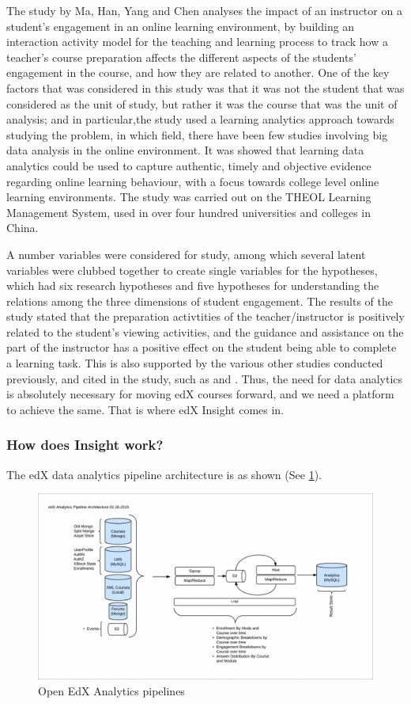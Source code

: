 \documentclass[14pt]{article}
\begin{document}
The study by Ma, Han, Yang and Chen \cite{ma2015examining} analyses the impact of an instructor on a student's engagement in an online learning environment, by building an interaction activity model for the teaching and learning process to track how a teacher's course preparation affects the different aspects of the students' engagement in the course, and how they are related to another. One of the key factors that was considered in this study was that it was not the student that was considered as the unit of study, but rather it was the course that was the unit of analysis; and in particular,the study used a learning analytics approach towards studying the problem, in which field, there have been few studies involving big data analysis in the online environment. It was showed that learning data analytics could be used to capture authentic, timely and objective evidence regarding online learning behaviour, with a focus towards college level online learning environments. The study was carried out on the THEOL Learning Management System, used in over four hundred universities and colleges in China.

A number variables were considered for study, among which several latent variables were clubbed together to create single variables for the hypotheses, which had six research hypotheses and five hypotheses for understanding the relations among the three dimensions of student engagement. The results of the study stated that the preparation activtities of the teacher/instructor is positively related to the student's viewing activities, and the guidance and assistance on the part of the instructor has a positive effect on the student being able to complete a learning task. This is also supported by the various  other studies conducted previously, and cited in the study, such as \cite{Morris2005221} and \cite{falakmasir2010using}. Thus, the need for data analytics is absolutely necessary for moving edX courses forward, and we need a platform to achieve the same. That is where edX Insight comes in.

\subsubsection{How does Insight work?}

The edX data analytics pipeline architecture is as shown (See \ref{fig:Image2}).

\begin{figure}[]
 \centering
 \includegraphics[width=12cm]{./edX_Architecture_Analytics.png}
 \caption{Open EdX Analytics pipelines \label{fig:Image2}}
\end{figure}
\end{document}
